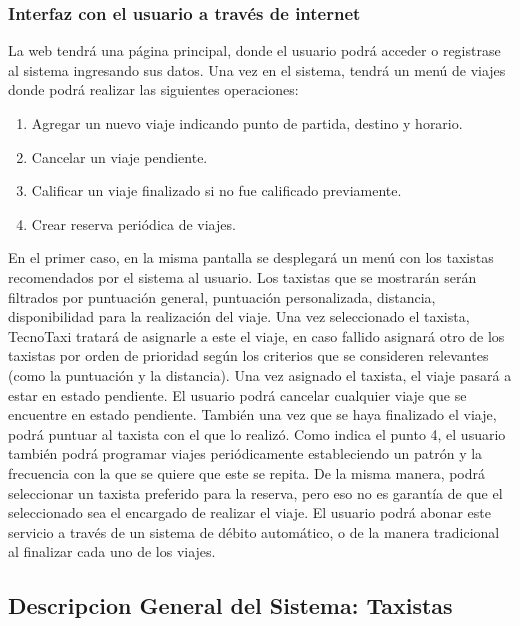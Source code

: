 	\subsubsection{Interfaz con el usuario a través de internet}
	La web tendrá una página principal, donde el usuario podrá acceder o registrase al sistema ingresando sus datos. Una vez en el sistema, tendrá un menú de viajes donde podrá realizar las siguientes operaciones:
	\begin{enumerate}
	\item Agregar un nuevo viaje indicando punto de partida, destino y horario.
	\item Cancelar un viaje pendiente.
	\item Calificar un viaje finalizado si no fue calificado previamente.
	\item Crear reserva periódica de viajes.
	\end{enumerate}
	En el primer caso, en la misma pantalla se desplegará un menú con los taxistas recomendados por el sistema al usuario. Los taxistas que se mostrarán serán filtrados por puntuación general, puntuación personalizada, distancia, disponibilidad para la realización del viaje. Una vez seleccionado el taxista, TecnoTaxi tratará de asignarle a este el viaje, en caso fallido asignará otro de los taxistas por orden de prioridad según los criterios que se consideren relevantes (como la puntuación y la distancia). Una vez asignado el taxista, el viaje pasará a estar en estado pendiente.
	El usuario podrá cancelar cualquier viaje que se encuentre en estado pendiente. También una vez que se haya finalizado el viaje, podrá puntuar al taxista con el que lo realizó.
	Como indica el punto 4, el usuario también podrá programar viajes periódicamente estableciendo un patrón y la frecuencia con la que se quiere que este se repita. De la misma manera, podrá seleccionar un taxista preferido para la reserva, pero eso no es garantía de que el seleccionado sea el encargado de realizar el viaje. El usuario podrá abonar este servicio a través de un sistema de débito automático, o de la manera tradicional al finalizar cada uno de los viajes.

\subsection{Descripcion General del Sistema: Taxistas}
